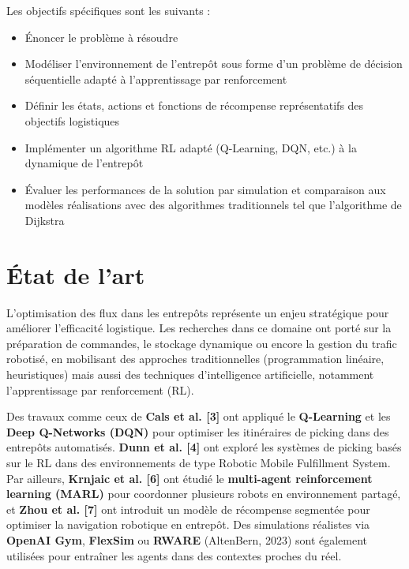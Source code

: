 \documentclass{article}
\begin{document}
Les objectifs spécifiques sont les suivants :
\begin{itemize}
    \item Énoncer le problème à résoudre
    \item Modéliser l'environnement de l'entrepôt sous forme d'un problème de décision séquentielle adapté à l'apprentissage par renforcement
    \item Définir les états, actions et fonctions de récompense représentatifs des objectifs logistiques
    \item Implémenter un algorithme RL adapté (Q-Learning, DQN, etc.) à la dynamique de l'entrepôt
    \item Évaluer les performances de la solution par simulation et comparaison aux modèles réalisations avec des algorithmes traditionnels tel que l'algorithme de Dijkstra
\end{itemize}

\section{État de l'art}
L'optimisation des flux dans les entrepôts représente un enjeu stratégique pour améliorer l'efficacité logistique. Les recherches dans ce domaine ont porté sur la préparation de commandes, le stockage dynamique ou encore la gestion du trafic robotisé, en mobilisant des approches traditionnelles (programmation linéaire, heuristiques) mais aussi des techniques d'intelligence artificielle, notamment l'apprentissage par renforcement (RL).

Des travaux comme ceux de \textbf{Cals et al. [3]} ont appliqué le \textbf{Q-Learning} et les \textbf{Deep Q-Networks (DQN)} pour optimiser les itinéraires de picking dans des entrepôts automatisés. \textbf{Dunn et al. [4]} ont exploré les systèmes de picking basés sur le RL dans des environnements de type Robotic Mobile Fulfillment System. Par ailleurs, \textbf{Krnjaic et al. [6]} ont étudié le \textbf{multi-agent reinforcement learning (MARL)} pour coordonner plusieurs robots en environnement partagé, et \textbf{Zhou et al. [7]} ont introduit un modèle de récompense segmentée pour optimiser la navigation robotique en entrepôt. Des simulations réalistes via \textbf{OpenAI Gym}, \textbf{FlexSim} ou \textbf{RWARE} (AltenBern, 2023) sont également utilisées pour entraîner les agents dans des contextes proches du réel.
\end{document}
